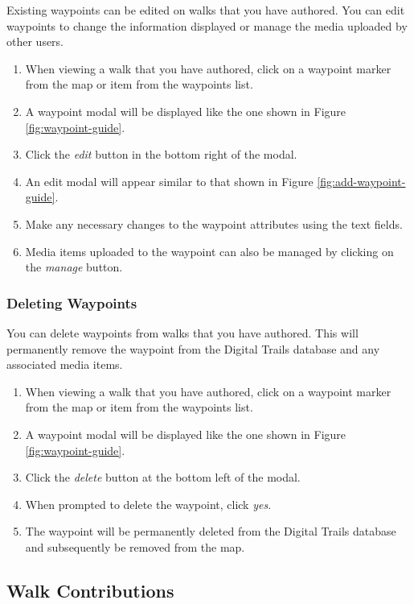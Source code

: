 \documentclass[11pt,a4paper]{report}
\begin{document}
Existing waypoints can be edited on walks that you have authored. You can edit waypoints to change the information displayed or manage the media uploaded by other users.

\begin{enumerate}
\item When viewing a walk that you have authored, click on a waypoint marker from the map or item from the waypoints list.
\item A waypoint modal will be displayed like the one shown in Figure \ref{fig:waypoint-guide}.
\item Click the \emph{edit} button in the bottom right of the modal.
\item An edit modal will appear similar to that shown in Figure \ref{fig:add-waypoint-guide}.
\item Make any necessary changes to the waypoint attributes using the text fields.
\item Media items uploaded to the waypoint can also be managed by clicking on the \emph{manage} button.
\end{enumerate}

\subsubsection{Deleting Waypoints}

You can delete waypoints from walks that you have authored. This will permanently remove the waypoint from the Digital Trails database and any associated media items.

\begin{enumerate}
\item When viewing a walk that you have authored, click on a waypoint marker from the map or item from the waypoints list.
\item A waypoint modal will be displayed like the one shown in Figure \ref{fig:waypoint-guide}.
\item Click the \emph{delete} button at the bottom left of the modal.
\item When prompted to delete the waypoint, click \emph{yes}.
\item The waypoint will be permanently deleted from the Digital Trails database and subsequently be removed from the map.
\end{enumerate}

\subsection{Walk Contributions}
\end{document}
